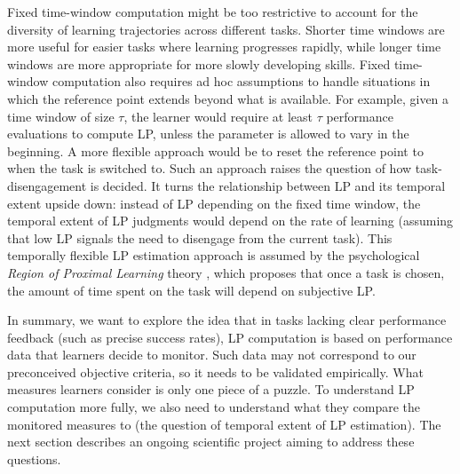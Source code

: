 
Fixed time-window computation might be too restrictive to account for the diversity of learning trajectories across different tasks. Shorter time windows are more useful for easier tasks where learning progresses rapidly, while longer time windows are more appropriate for more slowly developing skills. Fixed time-window computation also requires ad hoc assumptions to handle situations in which the reference point extends beyond what is available. For example, given a time window of size $\tau$, the learner would require at least $\tau$ performance evaluations to compute \ac{LP}, unless the parameter is allowed to vary in the beginning. A more flexible approach would be to reset the reference point to when the task is switched to. Such an approach raises the question of how task-disengagement is decided. It turns the relationship between \ac{LP} and its temporal extent upside down: instead of \ac{LP} depending on the fixed time window, the temporal extent of \ac{LP} judgments would depend on the rate of learning (assuming that low \ac{LP} signals the need to disengage from the current task). This temporally flexible \ac{LP} estimation approach is assumed by the psychological \emph{Region of Proximal Learning} theory \parencite{metcalfe_region_2005}, which proposes that once a task is chosen, the amount of time spent on the task will depend on subjective \ac{LP}.

In summary, we want to explore the idea that in tasks lacking clear performance feedback (such as precise success rates), \ac{LP} computation is based on performance data that learners decide to monitor. Such data may not correspond to our preconceived objective criteria, so it needs to be validated empirically. What measures learners consider is only one piece of a puzzle. To understand \ac{LP} computation more fully, we also need to understand what they compare the monitored measures to (the question of temporal extent of \ac{LP} estimation). The next section describes an ongoing scientific project aiming to address these questions.